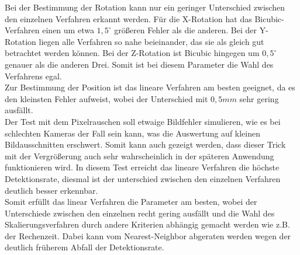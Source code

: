 Bei der Bestimmung der Rotation kann nur ein geringer Unterschied zwischen den einzelnen Verfahren erkannt werden. Für die X-Rotation hat das Bicubic-Verfahren einen um etwa $1,5^\circ$ größeren Fehler als die anderen. Bei der Y-Rotation liegen alle Verfahren so nahe beieinander, das sie als gleich gut betrachtet werden können. Bei der Z-Rotation ist Bicubic hingegen um $0,5^\circ$ genauer als die anderen Drei. Somit ist bei diesem Parameter die Wahl des Verfahrens egal.\\
Zur Bestimmung der Position ist das lineare Verfahren am besten geeignet, da es den kleinsten Fehler aufweist, wobei der Unterschied mit $0,5mm$ sehr gering ausfällt.\\
Der Test mit dem Pixelrauschen soll etwaige Bildfehler simulieren, wie es bei schlechten Kameras der Fall sein kann, was die Auswertung auf kleinen Bildausschnitten erschwert. Somit kann auch gezeigt werden, dass dieser Trick mit der Vergrößerung auch sehr wahrscheinlich in der späteren Anwendung funktionieren wird. In diesem Test erreicht das lineare Verfahren die höchste Detektionsrate, diesmal ist der unterschied zwischen den einzelnen Verfahren deutlich besser erkennbar.\\
Somit erfüllt das linear Verfahren die Parameter am besten, wobei der Unterschiede zwischen den einzelnen recht gering ausfällt und die Wahl des Skalierungsverfahren durch andere Kriterien abhängig gemacht werden wie z.B. der Rechenzeit. Dabei kann vom Nearest-Neighbor abgeraten werden wegen der deutlich früherem Abfall der Detektionsrate.
